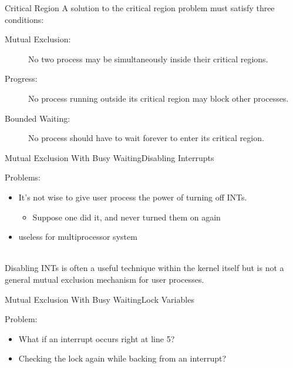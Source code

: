 \begin{frame}[label=cond]{Critical Region}
  A solution to the critical region problem must satisfy three conditions:
  \begin{description}
  \item[Mutual Exclusion:] No two process may be simultaneously inside their critical regions.
  \item[Progress:] No process running outside its critical region may block other processes.
  \item[Bounded Waiting:] No process should have to wait forever to enter its critical region.
  \end{description}
\end{frame}

\begin{frame}{Mutual Exclusion With Busy Waiting}{Disabling Interrupts}
  \begin{minipage}{.3\linewidth}
  \end{minipage}\quad
  \begin{minipage}{.65\linewidth}
    \begin{block}{Problems:}
      \begin{itemize}
      \item It's not wise to give user process the power of turning off INTs.
        \begin{itemize}
        \item Suppose one did it, and never turned them on again
        \end{itemize}
      \item useless for multiprocessor system
      \end{itemize}
    \end{block}
  \end{minipage}\\[1em]
  Disabling INTs is often a useful technique within the kernel itself but is not a general
  mutual exclusion mechanism for user processes.
\end{frame}

\begin{frame}{Mutual Exclusion With Busy Waiting}{Lock Variables}
  \begin{minipage}{.45\linewidth}
  \end{minipage}\quad
  \begin{minipage}{.5\linewidth}
    \begin{block}{Problem:}
      \begin{itemize}
      \item What if an interrupt occurs right at line 5?
      \item Checking the lock again while backing from an interrupt?
      \end{itemize}
    \end{block}
  \end{minipage}
\end{frame}

